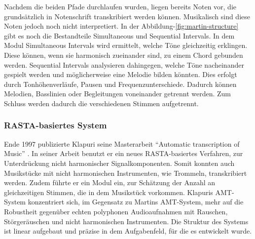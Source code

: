 Nachdem die beiden Pfade durchlaufen wurden, liegen bereits Noten vor,
die grundsätzlich in Notenschrift transkribiert werden können.
Musikalisch sind diese Noten jedoch noch nicht interpretiert.
In der Abbildung-\ref{fig:martin-structure} gibt es noch die Bestandteile Simultaneous und Sequential Intervals.
In dem Modul Simultaneous Intervals wird ermittelt, welche Töne gleichzeitig erklingen.
Diese können, wenn sie harmonisch zueinander sind, zu einem Chord gebunden werden.
Sequential Intervals analysieren dahingegen, welche Töne nacheinander gespielt werden und
möglicherweise eine Melodie bilden könnten.
Dies erfolgt durch Tonhöhenverläufe, Pausen und Frequenzunterschiede.
Dadurch können Melodien, Basslinien oder Begleitungen voneinander getrennt werden.
Zum Schluss werden dadurch die verschiedenen Stimmen aufgetrennt.

\subsubsection{RASTA-basiertes System}
Ende 1997 publizierte Klapuri seine Masterarbeit \enquote{Automatic transcription of Music} \cite{klapuri1998automatic}.
In seiner Arbeit benutzt er ein neues RASTA-basiertes Verfahren, zur Unterdrückung nicht harmonischer Signalkomponenten.
Somit konnten auch Musikstücke mit nicht harmonischen Instrumenten, wie Trommeln, transkribiert werden.
Zudem führte er ein Modul ein, zur Schätzung der Anzahl an gleichzeitigen Stimmen, die in dem Musikstück vorkommen.
Klapuris AMT-System konzentriert sich, im Gegensatz zu Martins AMT-System, mehr auf die Robustheit gegenüber
echten polyphonen Audioaufnahmen mit Rauschen, Störgeräuschen und nicht harmonischen Instrumenten.
Die Struktur des Systems ist linear aufgebaut und präzise in dem Aufgabenfeld, für die es entwickelt wurde.

